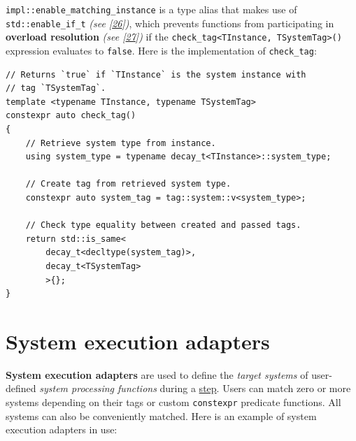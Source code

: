 \documentclass[twoside, 12pt, a4paper, openright]{book}
\begin{document}
\texttt{impl::enable_matching_instance}
is a type alias that makes use of
\texttt{std::enable_if_t}
\emph{(see {[}\protect\hyperlink{ref-cppreference_enable_if}{26}{]})},
which prevents functions from participating in \textbf{overload
resolution} \emph{(see
{[}\protect\hyperlink{ref-cppreference_overload_resolution}{27}{]})} if
the
\texttt{check_tag<TInstance, TSystemTag>()}
expression evaluates to
\texttt{false}.
Here is the implementation of
\texttt{check_tag}:

\begin{verbatim}
// Returns `true` if `TInstance` is the system instance with
// tag `TSystemTag`.
template <typename TInstance, typename TSystemTag>
constexpr auto check_tag()
{
    // Retrieve system type from instance.
    using system_type = typename decay_t<TInstance>::system_type;

    // Create tag from retrieved system type.
    constexpr auto system_tag = tag::system::v<system_type>;

    // Check type equality between created and passed tags.
    return std::is_same<
        decay_t<decltype(system_tag)>,
        decay_t<TSystemTag>
        >{};
}
\end{verbatim}

\section{System execution adapters}\label{system-execution-adapters}

\textbf{System execution adapters} are used to define the \emph{target
systems} of user-defined \emph{system processing functions} during a
\protect\hyperlink{step_stage}{step}. Users can match zero or more
systems depending on their tags or custom
\texttt{constexpr}
predicate functions. All systems can also be conveniently matched. Here
is an example of system execution adapters in use:
\end{document}
